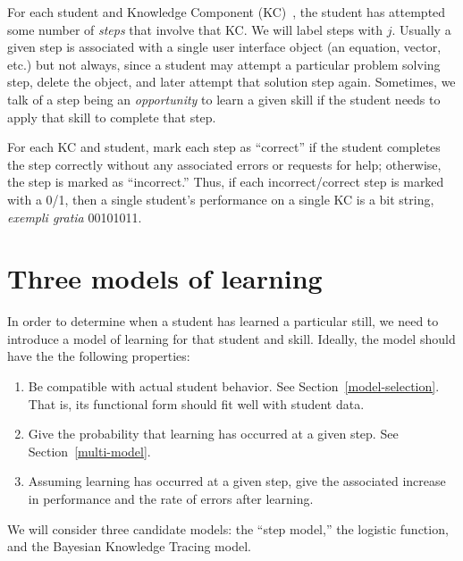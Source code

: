 \documentclass{acmlarge-edm}
\begin{document}
For each student and Knowledge Component (KC)~\cite{vanlehn_behavior_2006}, 
the student has attempted some number of 
{\em steps} that involve that KC.   We will label
steps with $j$.  Usually a given step is associated
with a single user interface object (an equation, vector, etc.)  but
not always, since a student may attempt a particular problem solving
step, delete the object, and later attempt that solution step again.
Sometimes, we talk of a step being an {\em opportunity} to learn
a given skill if the student needs to apply that skill
to complete that step.

%
%

For each KC and student, mark each step as ``correct'' if
the student completes the step correctly without any associated errors or 
requests for help; otherwise, the step is marked as ``incorrect.''
\label{steps} 
%
Thus, if each incorrect/correct step is marked with a 0/1, then
a single student's performance on a single KC is a bit string,
{\em exempli gratia} 00101011.

\section{Three models of learning}

In order to determine when a student has learned a particular still,
we need to introduce a model of learning for that student and skill.
Ideally, the model should have the the following properties:
\label{model-criteria}
%
\begin{enumerate} 

\item Be compatible with actual student behavior.
      See Section~\ref{model-selection}.  That is, its
      functional form should fit well with student data.

\item \label{crit:step}
      Give the probability that learning has occurred at a given step.
      See Section~\ref{multi-model}.

\item  \label{crit:perform}
      Assuming learning has occurred at a given step, give the 
     associated increase in performance and 
     the rate of errors after learning.

\end{enumerate}
%
We will consider three candidate models:  the ``step model,'' 
the logistic function, and the Bayesian Knowledge Tracing model.
\end{document}
